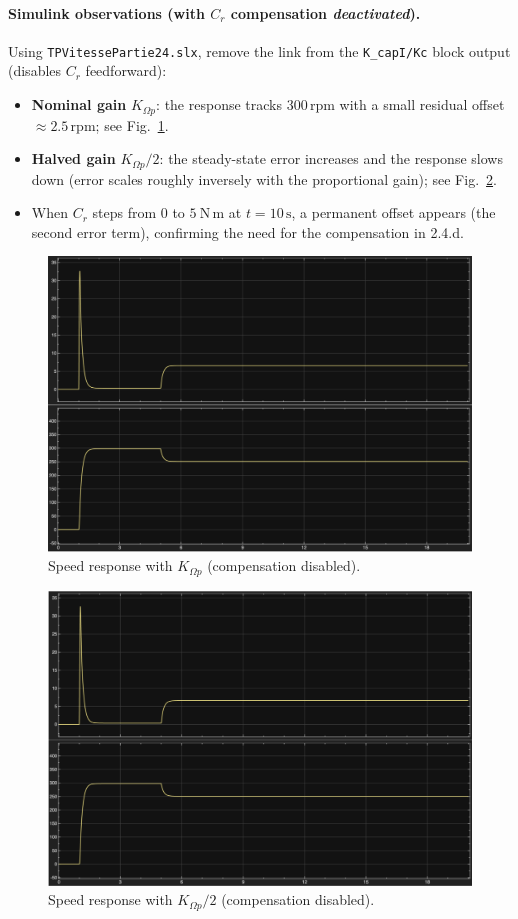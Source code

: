 \documentclass{rapportCS}
\begin{document}
\paragraph{Simulink observations (with $C_r$ compensation \emph{deactivated}).}
Using \texttt{TPVitessePartie24.slx}, remove the link from the \texttt{K\_capI/Kc} block output (disables $C_r$ feedforward):
\begin{itemize}
  \item \textbf{Nominal gain} $K_{\Omega p}$: the response tracks $300\,\mathrm{rpm}$ with a small residual offset $\approx 2.5\,\mathrm{rpm}$; see Fig.~\ref{fig:kw}.
  \item \textbf{Halved gain} $K_{\Omega p}/2$: the steady-state error increases and the response slows down (error scales roughly inversely with the proportional gain); see Fig.~\ref{fig:kwdiv2}.
  \item When $C_r$ steps from $0$ to $5~\mathrm{N\,m}$ at $t=10\,\mathrm{s}$, a permanent offset appears (the second error term), confirming the need for the compensation in 2.4.d. \,
\end{itemize}

\begin{figure}[h]
  \centering
  \includegraphics[width=.8\linewidth]{figures/kw}
  \caption{Speed response with $K_{\Omega p}$ (compensation disabled).}
  \label{fig:kw}
\end{figure}

\begin{figure}[h]
  \centering
  \includegraphics[width=.8\linewidth]{figures/kwdiv2}
  \caption{Speed response with $K_{\Omega p}/2$ (compensation disabled).}
  \label{fig:kwdiv2}
\end{figure}
\end{document}
